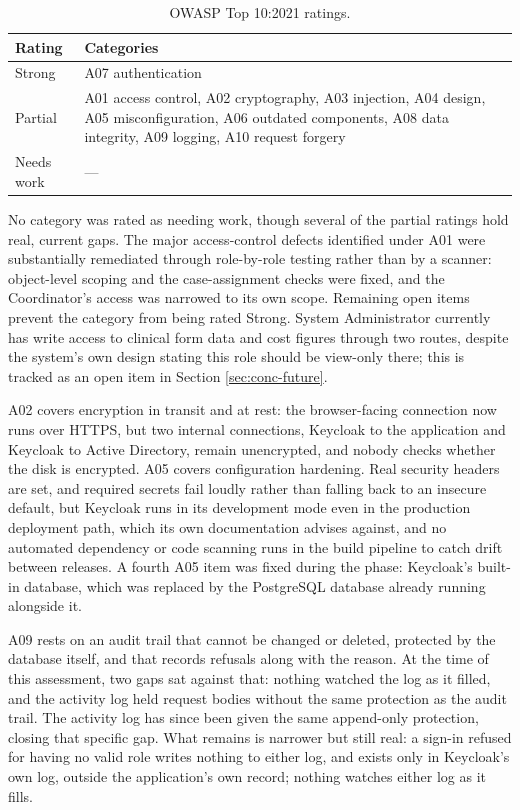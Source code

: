 \begin{table}[H]
\centering
\caption{OWASP Top 10:2021 ratings.}
\label{tab:owasp-ratings}
\begin{tabular}{|p{2.2cm}|p{11.7cm}|}
\hline
\textbf{Rating} & \textbf{Categories} \\
\hline
Strong & A07 authentication \\
\hline
Partial & A01 access control, A02 cryptography, A03 injection, A04 design, A05 misconfiguration, A06 outdated components, A08 data integrity, A09 logging, A10 request forgery \\
\hline
Needs work & --- \\
\hline
\end{tabular}
\end{table}

No category was rated as needing work, though several of the partial ratings hold real, current gaps. The major access-control defects identified under A01 were substantially remediated through role-by-role testing rather than by a scanner: object-level scoping and the case-assignment checks were fixed, and the Coordinator's access was narrowed to its own scope. Remaining open items prevent the category from being rated Strong. System Administrator currently has write access to clinical form data and cost figures through two routes, despite the system's own design stating this role should be view-only there; this is tracked as an open item in Section \ref{sec:conc-future}.

A02 covers encryption in transit and at rest: the browser-facing connection now runs over HTTPS, but two internal connections, Keycloak to the application and Keycloak to Active Directory, remain unencrypted, and nobody checks whether the disk is encrypted. A05 covers configuration hardening. Real security headers are set, and required secrets fail loudly rather than falling back to an insecure default, but Keycloak runs in its development mode even in the production deployment path, which its own documentation advises against, and no automated dependency or code scanning runs in the build pipeline to catch drift between releases. A fourth A05 item was fixed during the phase: Keycloak's built-in database, which was replaced by the PostgreSQL database already running alongside it.

A09 rests on an audit trail that cannot be changed or deleted, protected by the database itself, and that records refusals along with the reason. At the time of this assessment, two gaps sat against that: nothing watched the log as it filled, and the activity log held request bodies without the same protection as the audit trail. The activity log has since been given the same append-only protection, closing that specific gap. What remains is narrower but still real: a sign-in refused for having no valid role writes nothing to either log, and exists only in Keycloak's own log, outside the application's own record; nothing watches either log as it fills.

